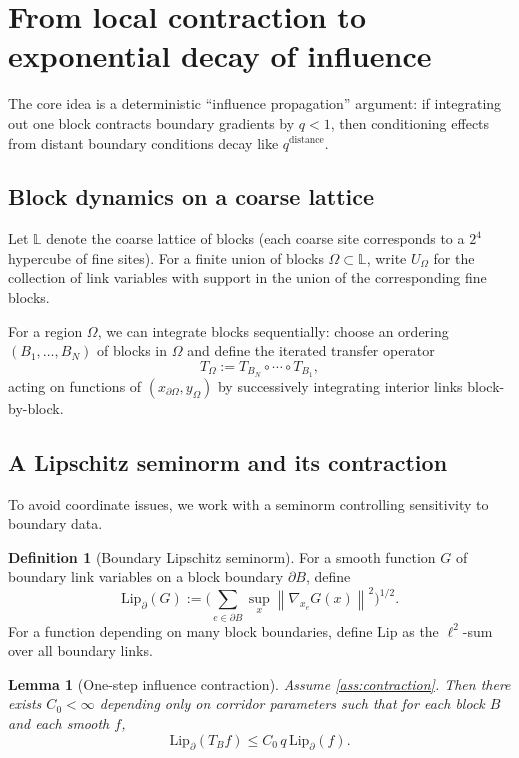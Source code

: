 \documentclass[11pt]{article}
\newtheorem{lemma}[theorem]{Lemma}
\theoremstyle{definition}
\newtheorem{definition}[theorem]{Definition}
\newcommand{\1}{\mathbf{1}}
\newcommand{\norm}[1]{\left\lVert#1\right\rVert}
\begin{document}
\section{From local contraction to exponential decay of influence}

The core idea is a deterministic ``influence propagation'' argument: if integrating out one block contracts boundary gradients by $q<1$, then conditioning effects from distant boundary conditions decay like $q^{\text{distance}}$.

\subsection{Block dynamics on a coarse lattice}
Let $\mathbb{L}$ denote the coarse lattice of blocks (each coarse site corresponds to a $2^4$ hypercube of fine sites). For a finite union of blocks $\Omega\subset\mathbb{L}$, write $U_\Omega$ for the collection of link variables with support in the union of the corresponding fine blocks.

For a region $\Omega$, we can integrate blocks sequentially: choose an ordering $(B_1,\dots,B_N)$ of blocks in $\Omega$ and define the iterated transfer operator
\begin{equation}
T_{\Omega} := T_{B_N}\circ\cdots\circ T_{B_1},
\end{equation}
acting on functions of $(x_{\partial\Omega}, y_{\Omega})$ by successively integrating interior links block-by-block.

\subsection{A Lipschitz seminorm and its contraction}
To avoid coordinate issues, we work with a seminorm controlling sensitivity to boundary data.

\begin{definition}[Boundary Lipschitz seminorm]
For a smooth function $G$ of boundary link variables on a block boundary $\partial B$, define
\begin{equation}
\mathrm{Lip}_\partial(G) := \Big(\sum_{e\in\partial B} \sup_x \norm{\nabla_{x_e}G(x)}^2\Big)^{1/2}.
\end{equation}
For a function depending on many block boundaries, define $\mathrm{Lip}$ as the $\ell^2$-sum over all boundary links.
\end{definition}

\begin{lemma}[One-step influence contraction]\label{lem:onestep}
Assume \ref{ass:contraction}. Then there exists $C_0<\infty$ depending only on corridor parameters such that for each block $B$ and each smooth $f$,
\begin{equation}
\mathrm{Lip}_\partial(T_B f) \le C_0\, q\, \mathrm{Lip}_\partial(f).
\end{equation}
\end{lemma}
\end{document}
